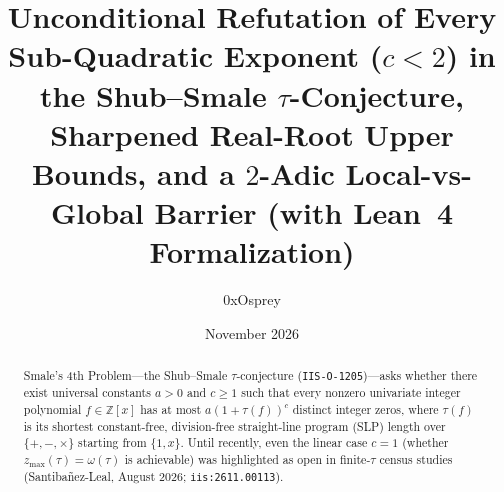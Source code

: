 \documentclass[11pt]{article}
\title{Unconditional Refutation of Every Sub-Quadratic Exponent ($c < 2$) in the Shub--Smale $\tau$-Conjecture, Sharpened Real-Root Upper Bounds, and a $2$-Adic Local-vs-Global Barrier (with Lean~4 Formalization)}
\author{0xOsprey}
\date{November 2026}
\newcommand{\Z}{\mathbb{Z}}
\newcommand{\code}[1]{\texttt{#1}}
\newcommand{\zmax}{z_{\max}}
\begin{document}
\maketitle

\begin{abstract}
Smale's 4th Problem---the Shub--Smale $\tau$-conjecture (\code{IIS-O-1205})---asks whether there exist universal constants $a > 0$ and $c \ge 1$ such that every nonzero univariate integer polynomial $f \in \Z[x]$ has at most $a(1 + \tau(f))^c$ distinct integer zeros, where $\tau(f)$ is its shortest constant-free, division-free straight-line program (SLP) length over $\{+, -, \times\}$ starting from $\{1, x\}$. Until recently, even the linear case $c = 1$ (whether $\zmax(\tau) = \omega(\tau)$ is achievable) was highlighted as open in finite-$\tau$ census studies (Santiba\~{n}ez-Leal, August 2026; \code{iis:2611.00113}).


\end{abstract}
\end{document}
